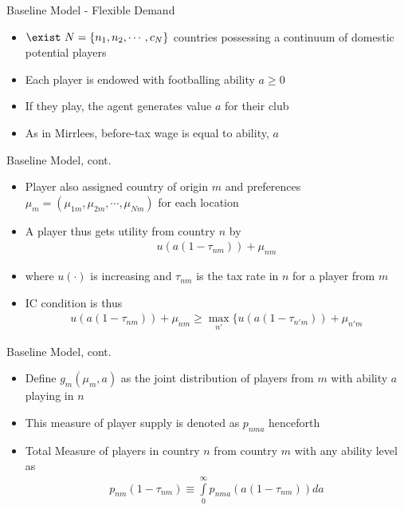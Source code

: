 \documentclass[aspectratio=169,professionalfonts]{beamer}
\begin{document}
\begin{frame}{Baseline Model - Flexible Demand}
  \begin{itemize}
    \item $\exist \ N = \{n_1, n_2, \cdots, c_N\}$ countries possessing a continuum of domestic potential players
    \item Each player is endowed with footballing ability $a\geq0$
    \item If they play, the agent generates value $a$ for their club
    \item As in Mirrlees, before-tax wage is equal to ability, $a$
  \end{itemize}
\end{frame}
\begin{frame}{Baseline Model, cont.}
  \begin{itemize}
    \item Player also assigned country of origin $m$ and preferences $\mu_m = (\mu_{1m}, \mu_{2m}, \cdots, \mu_{Nm})$ for each location
    \item A player thus gets utility from country $n$ by
    \begin{gather*}
      u(a(1-\tau_{nm})) + \mu_{nm}
    \end{gather*}
    \item where $u(\cdot)$ is increasing and $\tau_{nm}$ is the tax rate in $n$ for a player from $m$
    \item IC condition is thus
    \begin{gather*}
      u(a(1-\tau_{nm})) + \mu_{nm} \geq \max_{n'}\{u(a(1-\tau_{n'm})) + \mu_{n'm}
    \end{gather*}
  \end{itemize}
\end{frame}
\begin{frame}{Baseline Model, cont.}
  \begin{itemize}
    \item Define $g_m(\mu_m, a)$ as the joint distribution of players from $m$ with ability $a$ playing in $n$
    \item This measure of player supply is denoted as $p_{nma}$ henceforth
    \item Total Measure of players in country $n$ from country $m$ with any ability level as 
    \begin{gather*}
      p_{nm}(1-\tau_{nm}) \equiv \int\limits_0^{\infty}p_{nma}(a(1-\tau_{nm}))da
    \end{gather*}
  \end{itemize}
\end{frame}
\end{document}
